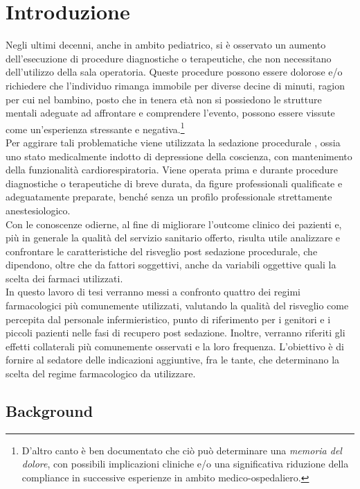 \chapter{Introduzione}

Negli ultimi decenni, anche in ambito pediatrico, si è osservato un aumento dell'esecuzione di procedure diagnostiche o terapeutiche, che non necessitano dell'utilizzo della sala operatoria. Queste procedure possono essere dolorose e/o richiedere che l'individuo rimanga immobile per diverse decine di minuti, ragion per cui nel bambino, posto che in tenera età non si possiedono le strutture mentali adeguate ad affrontare e comprendere l'evento, possono essere vissute come un'esperienza stressante e negativa.\footnote{D'altro canto è ben documentato \cite{Memoriadolorechir, Memoriadol2004, Memoryforpain1999} che ciò può determinare una \emph{memoria del dolore}, con possibili implicazioni cliniche e/o una significativa riduzione della compliance in successive esperienze in ambito medico-ospedaliero.}
\\Per aggirare tali problematiche viene utilizzata la sedazione procedurale \cite{Krauss2006, Simeupsedazione}, ossia uno stato medicalmente indotto di depressione della coscienza, con mantenimento della funzionalità cardiorespiratoria. Viene operata prima e durante procedure diagnostiche o terapeutiche di breve durata, da figure professionali qualificate e adeguatamente preparate, benché senza un profilo professionale strettamente anestesiologico. 
\\Con le conoscenze odierne, al fine di migliorare l'outcome clinico dei pazienti e, più in generale la qualità del servizio sanitario offerto, risulta utile analizzare e confrontare le caratteristiche del risveglio post sedazione procedurale, che dipendono, oltre che da fattori soggettivi, anche da variabili oggettive quali la scelta dei farmaci utilizzati. 
\\In questo lavoro di tesi verranno messi a confronto quattro dei regimi farmacologici più comunemente utilizzati, valutando la qualità del risveglio come percepita dal personale infermieristico, punto di riferimento per i genitori e i piccoli pazienti nelle fasi di recupero post sedazione. Inoltre, verranno riferiti gli effetti collaterali più comunemente osservati e la loro frequenza. L'obiettivo è di fornire al sedatore delle indicazioni aggiuntive, fra le tante, che determinano la scelta del regime farmacologico da utilizzare.

\section{Background}

